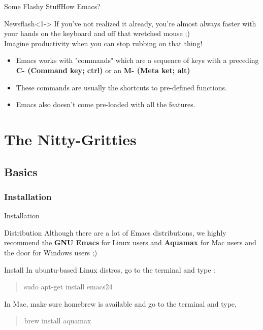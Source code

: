 \documentclass{beamer}
\begin{document}
\begin{frame}{Some Flashy Stuff}{How Emacs?}
\begin{block}{Newsflash}<1->
If you've not realized it already, you're almost always faster with your hands on the keyboard and off that wretched mouse ;)\\ {Imagine productivity when you can stop rubbing on that thing!}
\end{block}
\begin{itemize}
\item<3-> Emacs works with "commands" which are a sequence of keys with a preceding \textbf{C- (Command key; ctrl)} or an \textbf{M- (Meta ket; alt)}
\item<3-> These commands are usually the shortcuts to pre-defined functions. 
\item<5-> Emacs also doesn't come pre-loaded with all the features. 
\end{itemize}
\end{frame}

\section{The Nitty-Gritties}
\subsection{Basics}
\subsubsection{Installation}
\begin{frame}{Installation}
\begin{block}{Distribution}
Although there are a lot of Emacs distributions, we highly recommend the \textbf{GNU Emacs} for Linux users and \textbf{Aquamax} for Mac users and the door for Windows users ;)
\end{block}
\begin{block}{Install}
In ubuntu-based Linux distros, go to the terminal and type :
\begin{quote}
sudo apt-get install emacs24
\end{quote}
In Mac, make sure homebrew is available and go to the terminal and type,
\begin{quote}
brew install aquamax
\end{quote}

\end{block}
\end{frame}
\end{document}
